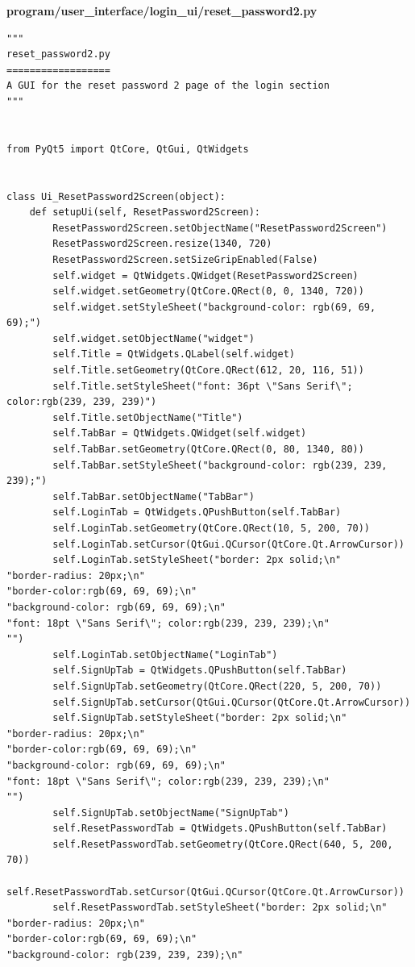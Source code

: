 \documentclass{article}
\begin{document}
\textbf{program/user\_interface/login\_ui/reset\_password2.py}
\begin{lstlisting}
"""
reset_password2.py
==================
A GUI for the reset password 2 page of the login section
"""


from PyQt5 import QtCore, QtGui, QtWidgets


class Ui_ResetPassword2Screen(object):
    def setupUi(self, ResetPassword2Screen):
        ResetPassword2Screen.setObjectName("ResetPassword2Screen")
        ResetPassword2Screen.resize(1340, 720)
        ResetPassword2Screen.setSizeGripEnabled(False)
        self.widget = QtWidgets.QWidget(ResetPassword2Screen)
        self.widget.setGeometry(QtCore.QRect(0, 0, 1340, 720))
        self.widget.setStyleSheet("background-color: rgb(69, 69, 69);")
        self.widget.setObjectName("widget")
        self.Title = QtWidgets.QLabel(self.widget)
        self.Title.setGeometry(QtCore.QRect(612, 20, 116, 51))
        self.Title.setStyleSheet("font: 36pt \"Sans Serif\"; color:rgb(239, 239, 239)")
        self.Title.setObjectName("Title")
        self.TabBar = QtWidgets.QWidget(self.widget)
        self.TabBar.setGeometry(QtCore.QRect(0, 80, 1340, 80))
        self.TabBar.setStyleSheet("background-color: rgb(239, 239, 239);")
        self.TabBar.setObjectName("TabBar")
        self.LoginTab = QtWidgets.QPushButton(self.TabBar)
        self.LoginTab.setGeometry(QtCore.QRect(10, 5, 200, 70))
        self.LoginTab.setCursor(QtGui.QCursor(QtCore.Qt.ArrowCursor))
        self.LoginTab.setStyleSheet("border: 2px solid;\n"
"border-radius: 20px;\n"
"border-color:rgb(69, 69, 69);\n"
"background-color: rgb(69, 69, 69);\n"
"font: 18pt \"Sans Serif\"; color:rgb(239, 239, 239);\n"
"")
        self.LoginTab.setObjectName("LoginTab")
        self.SignUpTab = QtWidgets.QPushButton(self.TabBar)
        self.SignUpTab.setGeometry(QtCore.QRect(220, 5, 200, 70))
        self.SignUpTab.setCursor(QtGui.QCursor(QtCore.Qt.ArrowCursor))
        self.SignUpTab.setStyleSheet("border: 2px solid;\n"
"border-radius: 20px;\n"
"border-color:rgb(69, 69, 69);\n"
"background-color: rgb(69, 69, 69);\n"
"font: 18pt \"Sans Serif\"; color:rgb(239, 239, 239);\n"
"")
        self.SignUpTab.setObjectName("SignUpTab")
        self.ResetPasswordTab = QtWidgets.QPushButton(self.TabBar)
        self.ResetPasswordTab.setGeometry(QtCore.QRect(640, 5, 200, 70))
        self.ResetPasswordTab.setCursor(QtGui.QCursor(QtCore.Qt.ArrowCursor))
        self.ResetPasswordTab.setStyleSheet("border: 2px solid;\n"
"border-radius: 20px;\n"
"border-color:rgb(69, 69, 69);\n"
"background-color: rgb(239, 239, 239);\n"

\end{lstlisting}
\end{document}
